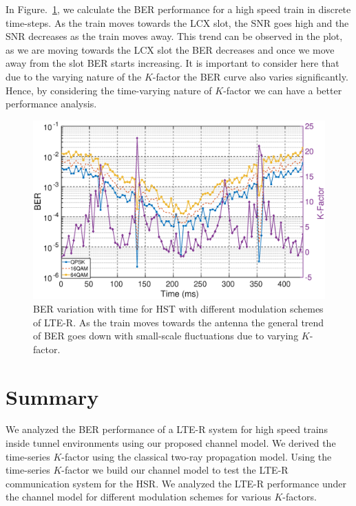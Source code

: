 In Figure.~\ref{kfactorber}, we calculate the BER performance for a high speed train in discrete time-steps. As the train moves towards the LCX slot, the SNR goes high and the SNR decreases as the train moves away. This trend can be observed in the plot, as we are moving towards the LCX slot the BER decreases and once we move away from the slot BER starts increasing. It is important to consider here that due to the varying nature of the $K$-factor the BER curve also varies significantly. Hence, by considering the time-varying nature of $K$-factor we can have a better performance analysis.

\begin{figure}[!ht]
\centering
\includegraphics[width=\textwidth,keepaspectratio]{images/Gill/lte_figs/kfactorcontinuous.eps} 
\caption{BER variation with time for HST with different modulation schemes of LTE-R. As the train moves towards
the antenna the general trend of BER goes down with small-scale fluctuations due to varying $K$-factor.}
\label{kfactorber}
\end{figure}

\section{Summary}
We analyzed the BER performance of a LTE-R system for high speed trains inside tunnel environments using our proposed channel model. We derived the time-series $K$-factor using the classical two-ray propagation model. Using the time-series $K$-factor we build our channel model to test the LTE-R communication system for the HSR. We analyzed the LTE-R performance under the channel model for different modulation schemes for various $K$-factors.

